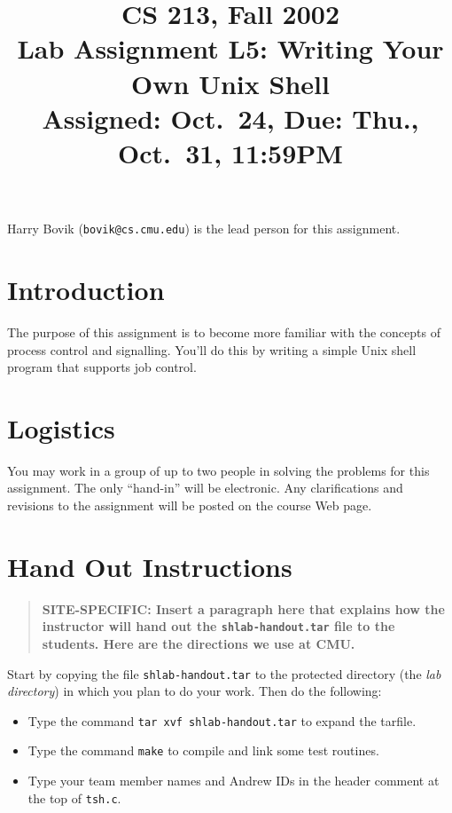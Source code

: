 \documentclass[11pt]{article}
\begin{document}
\title{CS 213, Fall 2002\\
Lab Assignment L5: Writing Your Own Unix Shell\\
Assigned: Oct.~24, Due: Thu., Oct.~31, 11:59PM
}

\author{}
\date{}

\maketitle

Harry Bovik ({\tt bovik@cs.cmu.edu}) is the lead person for
this assignment.

\section*{Introduction}
The purpose of this assignment is to become more familiar with the
concepts of process control and signalling. You'll do this by writing a
simple Unix shell program that supports job control.

\section*{Logistics}

You may work in a group of up to two people in solving the
problems for this assignment.  The only ``hand-in'' will be
electronic.  Any clarifications and revisions to the assignment will
be posted on the course Web page.

\section*{Hand Out Instructions}
\begin{quote}
\bf SITE-SPECIFIC: Insert a paragraph here that explains how the instructor
will hand out the \texttt{shlab-handout.tar} file to the students.
Here are the directions we use at CMU.
\end{quote}

Start by copying the file {\tt shlab-handout.tar}
to the protected directory (the {\em lab directory}) in which you plan
to do your work.  Then do the following:


\begin{itemize}
\item Type the command {\tt tar xvf shlab-handout.tar} 
to expand the tarfile.

\item Type the command {\tt make} to compile and link some
test routines.

\item Type your team member names and Andrew IDs in the header
comment at the top of {\tt tsh.c}.

\end{itemize}
\end{document}
